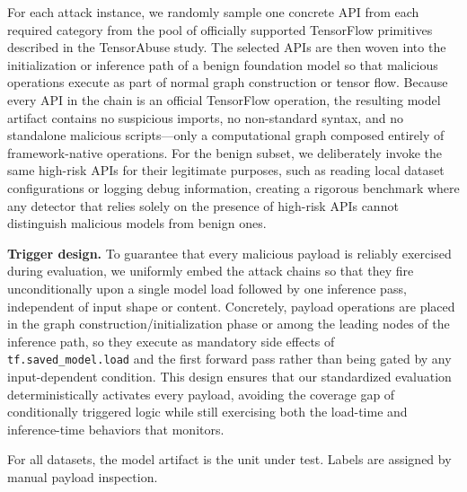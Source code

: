 For each attack instance, we randomly sample one concrete API from each required category from the pool of officially supported TensorFlow primitives described in the TensorAbuse study. The selected APIs are then woven into the initialization or inference path of a benign foundation model so that malicious operations execute as part of normal graph construction or tensor flow. Because every API in the chain is an official TensorFlow operation, the resulting model artifact contains no suspicious imports, no non-standard syntax, and no standalone malicious scripts—only a computational graph composed entirely of framework-native operations. For the benign subset, we deliberately invoke the same high-risk APIs for their legitimate purposes, such as reading local dataset configurations or logging debug information, creating a rigorous benchmark where any detector that relies solely on the presence of high-risk APIs cannot distinguish malicious models from benign ones.

\noindent \textbf{Trigger design.} To guarantee that every malicious payload is reliably exercised during evaluation, we uniformly embed the attack chains so that they fire unconditionally upon a single model load followed by one inference pass, independent of input shape or content. Concretely, payload operations are placed in the graph construction/initialization phase or among the leading nodes of the inference path, so they execute as mandatory side effects of \texttt{tf.saved\_model.load} and the first forward pass rather than being gated by any input-dependent condition. This design ensures that our standardized evaluation deterministically activates every payload, avoiding the coverage gap of conditionally triggered logic while still exercising both the load-time and inference-time behaviors that \toolname{} monitors.

For all datasets, the model artifact is the unit under test. Labels are assigned by manual payload inspection.


